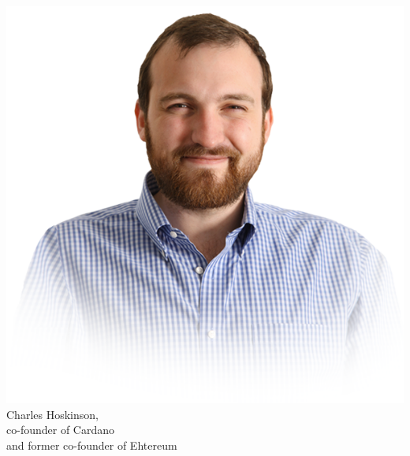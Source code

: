\documentclass[notitlepage, usenames,dvipsnames]{beamer}
\begin{document}
\begin{frame}
\begin{overlayarea}{\textwidth}{0.75\textheight}
{\begin{columns}
                \centering
                \includegraphics[scale=0.15]{../img/hoskinson.png}\\
                {\scriptsize Charles Hoskinson,\\ co-founder of Cardano\\[-1ex] and former co-founder of Ehtereum}

            \end{columns}
        }
    \end{overlayarea}
    \end{frame}
\end{document}
